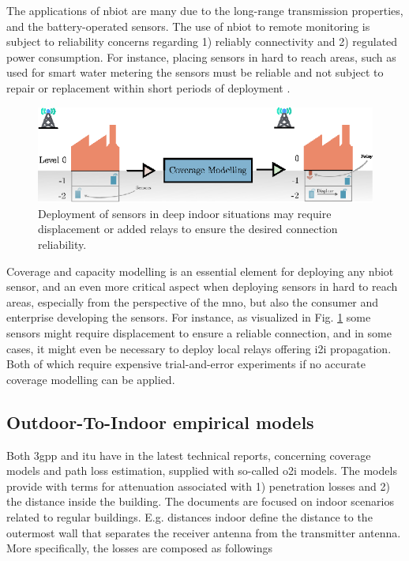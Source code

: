 The applications of \gls{nbiot} are many due to the long-range transmission properties, and the battery-operated sensors. The use of \gls{nbiot} to remote monitoring is subject to reliability concerns regarding 1) reliably connectivity and 2) regulated power consumption. For instance, placing sensors in hard to reach areas, such as used for smart water metering the sensors must be reliable and not subject to repair or replacement within short periods of deployment \cite{Popli2019AChallenges}. 



\begin{figure}
    \centering
    \includegraphics{chapters/part_pathloss/figures/outdoor_to_indoor/approach_figure.eps}
    \caption{Deployment of sensors in deep indoor situations may require displacement or added relays to ensure the desired connection reliability.}
    \label{fig:outdoor_to_indoor_approach}
\end{figure}

Coverage and capacity modelling is an essential element for deploying any \gls{nbiot} sensor, and an even more critical aspect when deploying sensors in hard to reach areas, especially from the perspective of the \gls{mno}, but also the consumer and enterprise developing the sensors. For instance, as visualized in Fig. \ref{fig:outdoor_to_indoor_approach} some sensors might require displacement to ensure a reliable connection, and in some cases, it might even be necessary to deploy local relays offering \gls{i2i} propagation. Both of which require expensive trial-and-error experiments if no accurate coverage modelling can be applied.  

\subsection{Outdoor-To-Indoor empirical models}
Both \gls{3gpp} and \gls{itu} have in the latest technical reports, concerning coverage models and path loss estimation, supplied with so-called \gls{o2i} models. The models provide with terms for attenuation associated with 1) penetration losses and 2) the distance inside the building. The documents are focused on indoor scenarios related to regular buildings. E.g. distances indoor define the distance to the outermost wall that separates the receiver antenna from the transmitter antenna. More specifically, the losses are composed as followings

